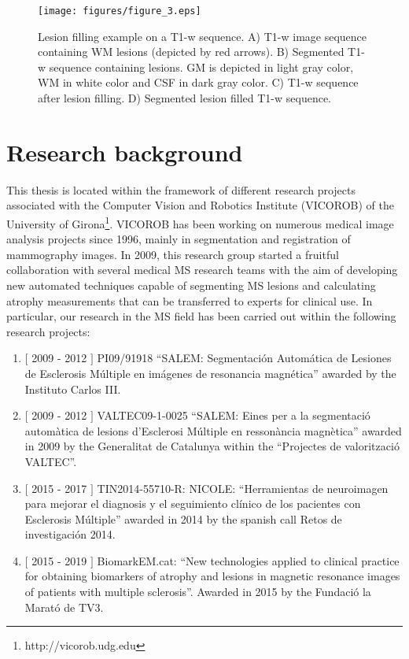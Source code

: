 \begin{figure}[top]
  \begin{center}
    \texttt{[image: figures/figure\_3.eps]}
  \end{center}
    \caption[Lesion filling example on a T1-w sequence]{Lesion filling example on a T1-w sequence. A) T1-w image sequence containing WM lesions (depicted by red arrows). B) Segmented T1-w sequence containing lesions. GM is depicted in light gray color, WM in white color and CSF in dark gray color.  C) T1-w sequence after lesion filling. D) Segmented lesion filled T1-w sequence.}
    \label{lesion_filling}
\end{figure}

\section{Research background}
\label{sec:research_background}

This thesis is located within the framework of different research projects associated with the Computer Vision and Robotics Institute (VICOROB) of the University of Girona\footnote{http://vicorob.udg.edu}. VICOROB has been working on numerous medical image analysis projects since 1996, mainly in segmentation and registration of mammography images. In 2009, this research group started a fruitful collaboration with several medical MS research teams with the aim of developing new automated techniques capable of segmenting MS lesions and calculating atrophy measurements that can be transferred to experts for clinical use. In particular, our research in the MS field has been carried out within the following research projects:

\begin{enumerate}

\item $[$ 2009 - 2012 $]$ PI09/91918 ``SALEM: Segmentaci\'{o}n Autom\'{a}tica de Lesiones de Esclerosis M\'{u}ltiple en im\'{a}genes de resonancia magn\'{e}tica'' awarded by the Instituto Carlos III. 

\item $[$ 2009 - 2012 $]$ VALTEC09-1-0025 ``SALEM: Eines per a la segmentaci\'{o} autom\`{a}tica de lesions d'Esclerosi M\'{u}ltiple en resson\`{a}ncia magn\`{e}tica'' awarded in 2009 by the Generalitat de Catalunya within the ``Projectes de valoritzaci\'{o} VALTEC''.

\item $[$ 2015 - 2017 $]$ TIN2014-55710-R: NICOLE: ``Herramientas de neuroimagen para mejorar el diagnosis y el seguimiento cl\'{i}nico de los pacientes con Esclerosis M\'{u}ltiple'' awarded in 2014 by the spanish call Retos de investigaci\'{o}n 2014.

\item $[$ 2015 - 2019 $]$ BiomarkEM.cat: ``New technologies applied to clinical practice for obtaining biomarkers of  atrophy and lesions in magnetic resonance images of patients with multiple sclerosis''. Awarded in 2015 by the Fundaci\'{o} la Marat\'{o} de TV3.

\end{enumerate}

